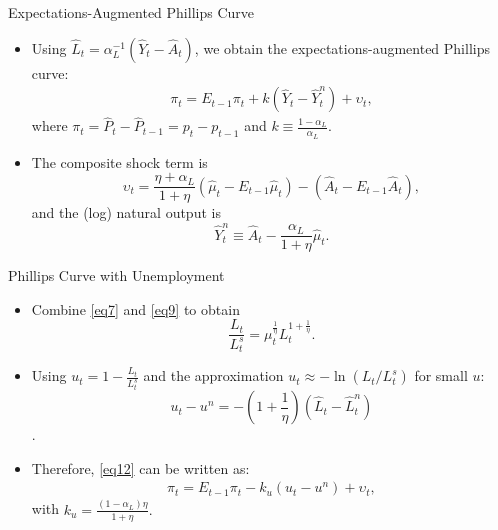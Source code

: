 \documentclass[11pt,aspectratio=169]{beamer}
\begin{document}
\begin{frame}{Expectations-Augmented Phillips Curve}
\small
\begin{itemize}
    \item Using \(\hat L_t=\alpha_L^{-1}(\hat Y_t-\hat A_t)\), we obtain the expectations-augmented Phillips curve:
    \begin{align}
        \pi _{t}=E_{t-1}\pi _{t}+k(\hat{Y}_{t}-\hat{Y}_{t}^{n})+\upsilon _{t},
        \label{eq12}
    \end{align}
    where \(\pi_t=\hat P_t-\hat P_{t-1}=p_t-p_{t-1}\) and \(k\equiv \frac{1-\alpha_L}{\alpha_L}\).
    
    \vspace{0.3cm}
    \item The composite shock term is
    \[
    \upsilon_t
    =\frac{\eta +\alpha _{L}}{1+\eta }(\hat{\mu}_{t}-E_{t-1}\hat{\mu}_{t})
    -(\hat{A}_{t}-E_{t-1}\hat{A}_{t}),
    \]
    and the (log) natural output is
    \[
    \hat{Y}_{t}^{n}\equiv \hat{A}_{t}-\frac{\alpha _{L}}{1+\eta }\hat{\mu}_{t}.
    \]
\end{itemize}
\end{frame}
\begin{frame}{Phillips Curve with Unemployment}
\begin{itemize}
    \item Combine \eqref{eq7} and \eqref{eq9} to obtain $$\frac{L_t}{L_t^s}=\mu_t^{\frac{1}{\eta}}L_t^{ 1+\frac{1}{\eta}}.$$
    \item Using $u_t=1-\frac{L_t}{L_t^s}$ and the approximation $u_t \approx -\ln(L_t/L_t^s)$ for small $u$: $$u_t-u^n= -\left(1+\frac{1}{\eta}\right)(\hat L_t-\hat L_t^n)$$. 
    \item Therefore, \eqref{eq12} can be written as: 
    \begin{align}
        \pi _{t}=E_{t-1}\pi _{t}-k_{u}(u_{t}-u^{n})+\upsilon _{t}, 
        \label{eq13}
    \end{align}
    with $k_u=\frac{(1-\alpha_L)\eta}{1+\eta}.$
\end{itemize}
\end{frame}
\end{document}
